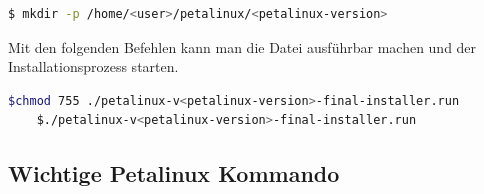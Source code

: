 \begin{lstlisting}[language=bash]
 	$ mkdir -p /home/<user>/petalinux/<petalinux-version>
\end{lstlisting}

Mit den folgenden Befehlen kann man die Datei ausführbar machen und der Installationsprozess starten.
\begin{lstlisting}[language=bash]
 	$chmod 755 ./petalinux-v<petalinux-version>-final-installer.run
	$./petalinux-v<petalinux-version>-final-installer.run
\end{lstlisting}

\subsection{Wichtige Petalinux Kommando}
\label{sec:Petalinux_Toolflow:petalinux:kommando}
